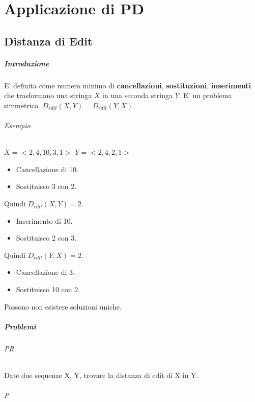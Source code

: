 \chapter{Applicazione di PD}

\section{Distanza di Edit}

\paragraph{Introduzione}

E' definita come numero minimo di \textbf{cancellazioni}, \textbf{sostituzioni}, \textbf{inserimenti} che trasformano una stringa $X$ in una seconda stringa $Y$. E' un problema simmetrico. $D_{edit}(X, Y) = D_{edit}(Y, X)$.

\subparagraph{Esempio}

$X = <2, 4, 10, 3, 1>$
$Y = <2, 4, 2, 1>$

\begin{itemize}
    \item Cancellazione di 10.
    \item Sostituisco 3 con 2.
\end{itemize}

Quindi $D_{edit}(X, Y) = 2$.

\begin{itemize}
    \item Inserimento di 10.
    \item Sostituisco 2 con 3.
\end{itemize}

Quindi $D_{edit}(Y, X) = 2$.

\begin{itemize}
    \item Cancellazione di 3.
    \item Sostituisco 10 con 2.
\end{itemize}

Possono non esistere soluzioni uniche.

\paragraph{Problemi}

\subparagraph{PR}

Date due sequenze X, Y, trovare la distanza di edit di X in Y.

\subparagraph{P}

